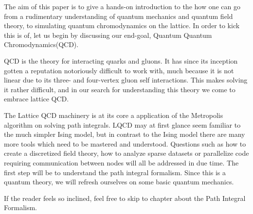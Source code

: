 The aim of this paper is to give a hands-on introduction to the how one can go from a rudimentary understanding of quantum mechanics and quantum field theory, to simulating quantum chromodynamics on the lattice. In order to kick this is of, let us begin by discussing our end-goal, Quantum Quantum Chromodynamics(QCD).

QCD is the theory for interacting quarks and gluons. It has since its inception gotten a reputation notoriously difficult to work with, much because it is not linear due to its three- and four-vertex gluon self interactions. This makes solving it rather difficult, and in our search for understanding this theory we come to embrace lattice QCD.

The Lattice QCD machinery is at its core a application of the Metropolis algorithm on solving path integrals. LQCD may at first glance seem familiar to the much simpler Ising model, but in contrast to the Ising model there are many more tools which need to be mastered and understood. Questions such as how to create a discretized field theory, how to analyze sparse datasets or parallelize code requiring communication between nodes will all be addressed in due time. The first step will be to understand the path integral formalism. Since this is a quantum theory, we will refresh ourselves on some basic quantum mechanics. 

If the reader feels so inclined, feel free to skip to chapter about the Path Integral Formalism.
